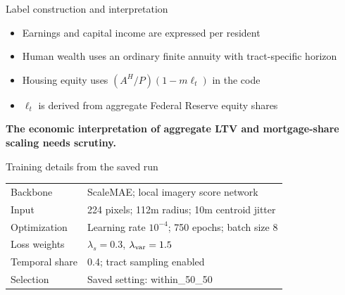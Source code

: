 \documentclass[11pt,aspectratio=169]{beamer}
\newcommand{\takeaway}[1]{\par{\color{mgAccent}\normalsize\bfseries #1\par}}
\begin{document}
\begin{frame}[label=b5]{Label construction and interpretation}

\begin{itemize}
\item Earnings and capital income are expressed per resident
\item Human wealth uses an ordinary finite annuity with tract-specific horizon
\item Housing equity uses $(A^H/P)(1-m\ell_t)$ in the code
\item $\ell_t$ is derived from aggregate Federal Reserve equity shares
\end{itemize}
\par\vfill\takeaway{The economic interpretation of aggregate LTV and mortgage-share scaling needs scrutiny.}

\end{frame}

\begin{frame}[label=b6]{Training details from the saved run}

\begin{tabularx}{\textwidth}{@{}l X@{}}
Backbone & ScaleMAE; local imagery score network\\[.3cm]
Input & 224 pixels; 112m radius; 10m centroid jitter\\[.3cm]
Optimization & Learning rate $10^{-4}$; 750 epochs; batch size 8\\[.3cm]
Loss weights & $\lambda_s=0.3$, $\lambda_{\rm var}=1.5$\\[.3cm]
Temporal share & 0.4; tract sampling enabled\\[.3cm]
Selection & Saved setting: within\_50\_50
\end{tabularx}

\end{frame}
\end{document}
